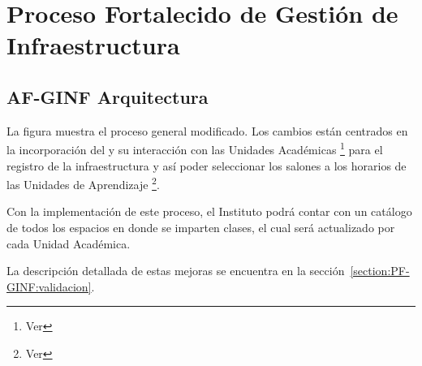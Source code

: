 \chapter{Proceso Fortalecido de Gestión de Infraestructura}
\hypertarget{chapter:PFGINF}{}

		
		\section{AF-GINF Arquitectura}
		
		
		\noindent La figura  muestra el proceso general modificado. Los cambios están centrados en la incorporación del  y su interacción con las Unidades Académicas \footnote{Ver } para el registro de la infraestructura y así poder seleccionar los salones a los horarios de las Unidades de Aprendizaje \footnote{Ver }. 
		
		
		Con la implementación de este proceso, el Instituto podrá contar con un catálogo de todos los espacios en donde se imparten clases, el cual será actualizado por cada Unidad Académica.
		
		La descripción detallada de estas mejoras se encuentra en la sección~\ref{section:PF-GINF:validacion}.
		 
		 \pagebreak
		
